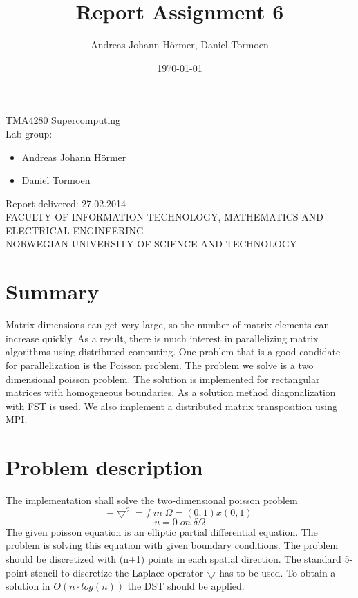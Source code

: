 \documentclass{article}
\title{Report Assignment 6}
\author{Andreas Johann H\"ormer, Daniel Tormoen}
\date{\today}
\begin{document}
\thispagestyle{empty}
\maketitle
\thispagestyle{empty}
\begin{center}
TMA4280 Supercomputing\\[3cm]
Lab group:
\begin{itemize}
\item Andreas Johann H\"ormer
\item Daniel Tormoen\\[3cm]
\end{itemize}
Report delivered: 27.02.2014\\[6cm]
FACULTY OF INFORMATION TECHNOLOGY, MATHEMATICS AND ELECTRICAL ENGINEERING\\
NORWEGIAN UNIVERSITY OF SCIENCE AND TECHNOLOGY
\end{center}
\thispagestyle{empty}
\newpage
\tableofcontents
\thispagestyle{empty}
\newpage
\section*{Summary}
\thispagestyle{empty}
Matrix dimensions can get very large, so the number of matrix elements can increase quickly. As a result, there is much interest in parallelizing matrix algorithms using distributed computing. One problem that is a good candidate for parallelization is the Poisson problem. The problem we solve is a two dimensional poisson problem. The solution is implemented for rectangular matrices with homogeneous boundaries. As a solution method diagonalization with FST is used. We also implement a distributed matrix transposition using MPI.
\newpage
\setcounter{page}{1}
\section{Problem description}
The implementation shall solve the two-dimensional poisson problem 
\begin{equation}
-\bigtriangledown^2=f\;in\;\Omega = (0,1)x(0,1)
\end{equation}
\begin{equation}
u = 0\;on\;\delta\Omega
\end{equation}
The given poisson equation is an elliptic partial differential equation. The problem is solving this equation with given boundary conditions. 
The problem should be discretized with (n+1) points in each spatial direction. The standard 5-point-stencil to discretize the Laplace operator $\bigtriangledown$ has to be used. To obtain a solution in $O(n\cdot log(n))$ the DST should be applied.
\end{document}
